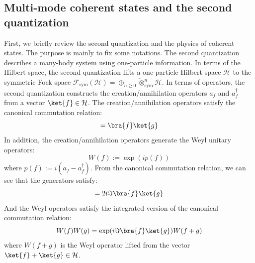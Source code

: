 \documentclass[a4paper,11pt]{article}
\theoremstyle{definition}
\numberwithin{equation}{section}
\begin{document}
\subsection{Multi-mode coherent states and the second quantization}\label{subsec:multimodecoherent}


First, we briefly review the second quantization and the physics of coherent states. The purpose is mainly to fix some notations. The second quantization describes a many-body system using one-particle information. In terms of the Hilbert space, the second quantization lifts a one-particle Hilbert space $\mathcal{H}$ to the symmetric Fock space $\mathcal{F}_\text{sym}(\mathcal{H}) = \overline{\oplus_{n\geq 0}\otimes_\text{sym}^n\mathcal{H}}$. In terms of operators, the second quantization constructs the creation/annihilation operators $a_f$ and $a_f^\dagger$ from a vector $\ket{f}\in\mathcal{H}$. The creation/annihilation operators satisfy the canonical commutation relation:
\begin{equation}
    [a_f, a^\dagger_g] = \bra{f}\ket{g}
\end{equation}
In addition, the creation/annihilation operators generate the Weyl unitary operators:
\begin{equation}
    W(f) := \exp(i p(f))
\end{equation}
where $p(f):=i(a_f - a^\dagger_f)$. From the canonical commutation relation, we can see that the generators satisfy:
\begin{equation}
    [p(f), p(g)] = 2i\Im\bra{f}\ket{g}
\end{equation}
And the Weyl operators satisfy the integrated version of the canonical commutation relation:
\begin{equation}
    W(f)W(g) = \exp(i\Im\bra{f}\ket{g})W(f + g)
\end{equation}
where $W(f + g)$ is the Weyl operator lifted from the vector $\ket{f} + \ket{g}\in\mathcal{H}$.
\end{document}
